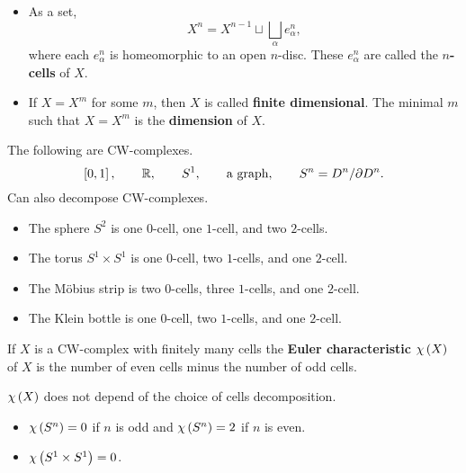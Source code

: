 \begin{remark*}
\hfill
\begin{itemize}
\item As a set,
$$ X^n = X^{n - 1} \sqcup \bigsqcup_\alpha e_\alpha^n, $$
where each $ e_\alpha^n $ is homeomorphic to an open $ n $-disc. These $ e_\alpha^n $ are called the \textbf{$ n $-cells} of $ X $.
\item If $ X = X^m $ for some $ m $, then $ X $ is called \textbf{finite dimensional}. The minimal $ m $ such that $ X = X^m $ is the \textbf{dimension} of $ X $.
\end{itemize}
\end{remark*}

\begin{example*}
The following are CW-complexes.
$$ \left[ 0, 1 \right], \qquad \mathbb{R}, \qquad S^1, \qquad \text{a graph}, \qquad S^n = D^n / \partial D^n. $$
Can also decompose CW-complexes.
\begin{itemize}
\item The sphere $ S^2 $ is one $ 0 $-cell, one $ 1 $-cell, and two $ 2 $-cells.
\item The torus $ S^1 \times S^1 $ is one $ 0 $-cell, two $ 1 $-cells, and one $ 2 $-cell.
\item The M\"obius strip is two $ 0 $-cells, three $ 1 $-cells, and one $ 2 $-cell.
\item The Klein bottle is one $ 0 $-cell, two $ 1 $-cells, and one $ 2 $-cell.
\end{itemize}
\end{example*}

\begin{definition*}
If $ X $ is a CW-complex with finitely many cells the \textbf{Euler characteristic} $ \chi\left( X \right) $ of $ X $ is the number of even cells minus the number of odd cells.
\end{definition*}

\begin{fact*}
$ \chi\left( X \right) $ does not depend of the choice of cells decomposition.
\end{fact*}

\begin{example*}
\hfill
\begin{itemize}
\item $ \chi\left( S^n \right) = 0 $ if $ n $ is odd and $ \chi\left( S^n \right) = 2 $ if $ n $ is even.
\item $ \chi\left( S^1 \times S^1 \right) = 0 $.
\end{itemize}
\end{example*}

